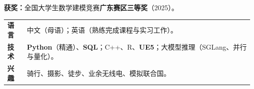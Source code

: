 \documentclass[10pt,letterpaper]{article}
\begin{document}
\vspace{0.1em}
\noindent\textbf{获奖：}全国大学生数学建模竞赛\textbf{广东赛区三等奖}（2025）。

\vspace{0.2em}
\noindent\small
\begin{tabularx}{\linewidth}{@{}p{3.6em}Y@{}}
  \textbf{语言} & 中文（母语）；英语（熟练完成课程与实习工作）。 \\[0.06em]
  \textbf{技术} & \textbf{Python}（精通）、\textbf{SQL}；C++、R、\textbf{UE5}；大模型推理（SGLang、并行与量化）。 \\[0.06em]
  \textbf{兴趣} & 骑行、摄影、徒步、业余无线电、模拟联合国。 \\
\end{tabularx}
\end{document}
